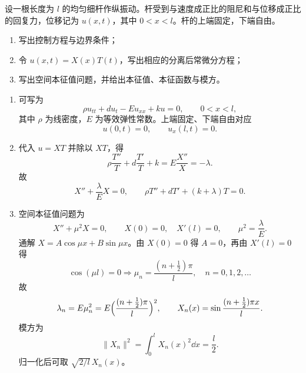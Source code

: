 ﻿


\begin{question}
设一根长度为 $l$ 的均匀细杆作纵振动。杆受到与速度成正比的阻尼和与位移成正比的回复力，位移记为 $u(x,t)$，其中 $0<x<l$。杆的上端固定，下端自由。
\begin{enumerate}[label=(\arabic*),leftmargin=2.8em,itemsep=0.2em]
\item 写出控制方程与边界条件；
\item 令 $u(x,t)=X(x)T(t)$，写出相应的分离后常微分方程；
\item 写出空间本征值问题，并给出本征值、本征函数与模方。
\end{enumerate}
\begin{solution}

\begin{enumerate}[label=(\arabic*),leftmargin=2.8em,itemsep=0.2em]
\item 可写为
\[
\rho u_{tt}+d u_t-Eu_{xx}+ku=0,
\qquad 0<x<l,
\]
其中 $\rho$ 为线密度，$E$ 为等效弹性常数。上端固定、下端自由对应
\[
 u(0,t)=0,\qquad u_x(l,t)=0.
\]
\item 代入 $u=XT$ 并除以 $XT$，得
\[
\rho \frac{T''}{T}+d\frac{T'}{T}+k=E\frac{X''}{X}=-\lambda.
\]
故
\[
X''+\frac{\lambda}{E}X=0,
\qquad
\rho T''+dT'+(k+\lambda)T=0.
\]
\item 空间本征值问题为
\[
X''+\mu^2X=0,
\qquad X(0)=0,\quad X'(l)=0,
\qquad \mu^2=\frac{\lambda}{E}.
\]
通解 $X=A\cos\mu x+B\sin\mu x$。由 $X(0)=0$ 得 $A=0$，再由 $X'(l)=0$ 得
\[
\cos(\mu l)=0\Longrightarrow \mu_n=\frac{(n+\tfrac12)\pi}{l},\quad n=0,1,2,\dots
\]
故
\[
\lambda_n=E\mu_n^2=E\Bigl(\frac{(n+\tfrac12)\pi}{l}\Bigr)^2,
\qquad X_n(x)=\sin\frac{(n+\tfrac12)\pi x}{l}.
\]
模方为
\[
\|X_n\|^2=\int_0^l X_n(x)^2\dd{x}=\frac l2.
\]
归一化后可取 $\sqrt{2/l}\,X_n(x)$。
\end{enumerate}

\end{solution}
\end{question}


